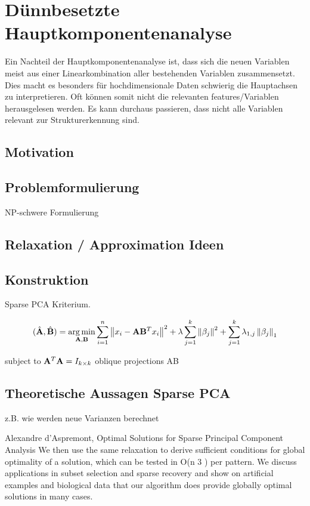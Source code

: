 \chapter{Dünnbesetzte Hauptkomponentenanalyse}

\label{sparse_pca}

Ein Nachteil der Hauptkomponentenanalyse ist, dass sich die neuen Variablen meist aus einer Linearkombination aller bestehenden Variablen zusammensetzt. Dies macht es besonders für hochdimensionale Daten schwierig die Hauptachsen zu interpretieren. Oft können somit nicht die relevanten features/Variablen herausgelesen werden. Es kann durchaus passieren, dass nicht alle Variablen relevant zur Strukturerkennung sind. 

\section{Motivation}

\section{Problemformulierung}
NP-schwere Formulierung

\section{Relaxation / Approximation Ideen}

\section{Konstruktion}

Sparse PCA Kriterium.

$$(\hat{\mathbf{A}}, \hat{\mathbf{B}}) = \operatorname*{arg\,min}_{\mathbf{A}, \mathbf{B}} \sum_{i=1}^{n} \left\lVert x_i - \mathbf{A}\mathbf{B}^Tx_i \right\rVert^2 + \lambda \sum_{j=1}^{k}\left\lVert \beta_j \right\rVert^2 + \sum_{j=1}^k \lambda_{1,j} \left\lVert \beta_j \right\rVert_1$$

subject to $\mathbf{A}^T\mathbf{A} = I_{k \times k}$
oblique projections AB

\section{Theoretische Aussagen Sparse PCA}
z.B. wie werden neue Varianzen berechnet

Alexandre d’Aspremont, Optimal Solutions for Sparse Principal Component Analysis
We then use the same relaxation to derive sufficient conditions for global optimality of a
solution, which can be tested in O(n
3
) per pattern. We discuss applications in subset selection and
sparse recovery and show on artificial examples and biological data that our algorithm does provide
globally optimal solutions in many cases.